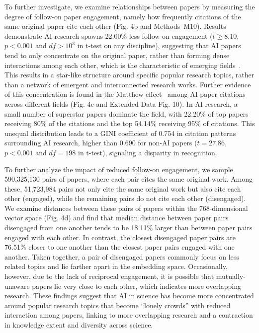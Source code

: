 To further investigate, we examine relationships between papers by measuring the degree of follow-on paper engagement, namely how frequently citations of the same original paper cite each other (Fig. 4b and Methods~M10).
Results demonstrate AI research spawns 22.00\% less follow-on engagement ($t\geq8.10$, $p<0.001$ and $df>10^3$ in t-test on any discipline), suggesting that AI papers tend to only concentrate on the original paper, rather than forming dense interactions among each other, which is the characteristic of emerging fields~\supercite{mcmahan2018ambiguity}.
This results in a star-like structure around specific popular research topics, rather than a network of emergent and interconnected research works.
Further evidence of this concentration is found in the Matthew effect~\supercite{merton1968matthew} among AI paper citations across different fields (Fig. 4c and Extended Data Fig. 10).
In AI research, a small number of superstar papers dominate the field, with 22.20\% of top papers receiving 80\% of the citations and the top 54.14\% receiving 95\% of citations. This unequal distribution leads to a GINI coefficient of 0.754 in citation patterns surrounding AI research, higher than 0.690 for non-AI papers ($t=27.86$, $p<0.001$ and $df=198$ in t-test), signaling a disparity in recognition.

To further analyze the impact of reduced follow-on engagement, we sample 590,325,130 pairs of papers, where each pair cites the same original work.
Among these, 51,723,984 pairs not only cite the same original work but also cite each other (engaged), while the remaining pairs do not cite each other (disengaged).
We examine distances between these pairs of papers within the 768-dimensional vector space (Fig. 4d) and find that median distance between paper pairs disengaged from one another tends to be 18.11\% larger than between paper pairs engaged with each other.
In contrast, the closest disengaged paper pairs are 76.51\% closer to one another than the closest paper pairs engaged with one another.
Taken together, a pair of disengaged papers commonly focus on less related topics and lie farther apart in the embedding space.
Occasionally, however, due to the lack of reciprocal engagement, it is possible that mutually-unaware papers lie very close to each other, which indicates more overlapping research.
These findings suggest that AI in science has become more concentrated around popular research topics that become “lonely crowds” with reduced interaction among papers, linking to more overlapping research and a contraction in knowledge extent and diversity across science.